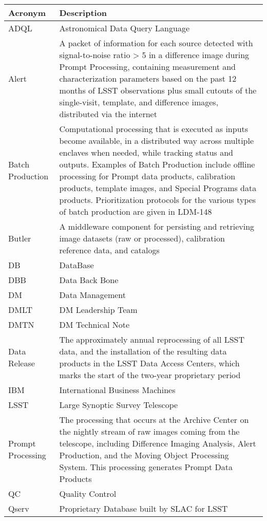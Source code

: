 \addtocounter{table}{-1}
\begin{longtable}{|p{}|p{}|}\hline
\textbf{Acronym} & \textbf{Description}  \\\hline

ADQL & Astronomical Data Query Language \\\hline
Alert & A packet of information for each source detected with signal-to-noise ratio > 5 in a difference image during Prompt Processing, containing measurement and characterization parameters based on the past 12 months of LSST observations plus small cutouts of the single-visit, template, and difference images, distributed via the internet \\\hline
Batch Production & Computational processing that is executed as inputs become available, in a distributed way across multiple enclaves when needed, while tracking status and outputs. Examples of Batch Production include offline processing for Prompt data products, calibration products, template images, and Special Programs data products. Prioritization protocols for the various types of batch production are given in LDM-148 \\\hline
Butler & A middleware component for persisting and retrieving image datasets (raw or processed), calibration reference data, and catalogs \\\hline
DB & DataBase \\\hline
DBB & Data Back Bone \\\hline
DM & Data Management \\\hline
DMLT & DM Leadership Team \\\hline
DMTN & DM Technical Note \\\hline
Data Release & The approximately annual reprocessing of all LSST data, and the installation of the resulting data products in the LSST Data Access Centers, which marks the start of the two-year proprietary period \\\hline
IBM & International Business Machines \\\hline
LSST & Large Synoptic Survey Telescope \\\hline
Prompt Processing & The processing that occurs at the Archive Center on the nightly stream of raw images coming from the telescope, including Difference Imaging Analysis, Alert Production, and the Moving Object Processing System. This processing generates Prompt Data Products \\\hline
QC & Quality Control \\\hline
Qserv & Proprietary Database built by SLAC for LSST \\\hline

\end{longtable}
